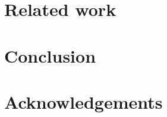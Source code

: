 \documentclass[conference]{IEEEtran}
\begin{document}
\label{sec:case-studies}

\section{Related work}

\label{sec:related-work}

\section{Conclusion}

\label{sec:conclusion}

\section{Acknowledgements}

\label{sec:acknowledgements}

\printbibliography

\vspace{12pt}

\appendix

\end{document}
